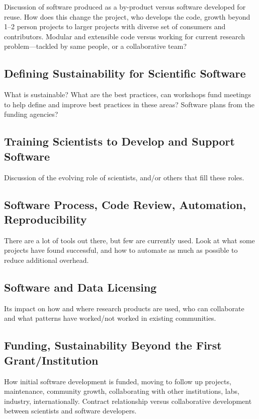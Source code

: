 \documentclass[11pt, oneside]{amsart}
\begin{document}
Discussion of software produced as a by-product versus software developed for reuse. How does this change the project, who develops the code, growth beyond 1--2 person projects to larger projects with diverse set of consumers and contributors. Modular and extensible code versus working for current research problem---tackled by same people, or a collaborative team?

\subsection{Defining Sustainability for Scientific Software}

What is sustainable? What are the best practices, can workshops fund meetings to help define and improve best practices in these areas? Software plans from the funding agencies? 

\subsection{Training Scientists to Develop and Support Software}

Discussion of the evolving role of scientists, and/or others that fill these roles.

\subsection{Software Process, Code Review, Automation, Reproducibility}

There are a lot of tools out there, but few are currently used. Look at what some projects have found successful, and how to automate as much as possible to reduce additional overhead.

\subsection{Software and Data Licensing}

Its impact on how and where research products are used, who can collaborate and what patterns have worked/not worked in existing communities.

\subsection{Funding, Sustainability Beyond the First Grant/Institution}

How initial software development is funded, moving to follow up projects, maintenance, community growth, collaborating with other institutions, labs, industry, internationally. Contract relationship versus collaborative development between scientists and software developers.
\end{document}
